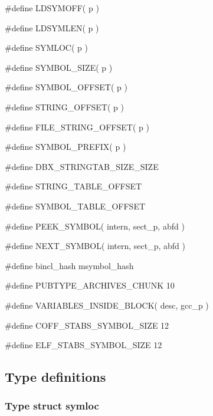 {\stt \#define LDSYMOFF( p )}

\medskip
{\stt \#define LDSYMLEN( p )}

\medskip
{\stt \#define SYMLOC( p )}

\medskip
{\stt \#define SYMBOL\_SIZE( p )}

\medskip
{\stt \#define SYMBOL\_OFFSET( p )}

\medskip
{\stt \#define STRING\_OFFSET( p )}

\medskip
{\stt \#define FILE\_STRING\_OFFSET( p )}

\medskip
{\stt \#define SYMBOL\_PREFIX( p )}

\medskip
{\stt \#define DBX\_STRINGTAB\_SIZE\_SIZE}

\medskip
{\stt \#define STRING\_TABLE\_OFFSET}

\medskip
{\stt \#define SYMBOL\_TABLE\_OFFSET}

\medskip
{\stt \#define PEEK\_SYMBOL( intern, sect\_p, abfd )}

\medskip
{\stt \#define NEXT\_SYMBOL( intern, sect\_p, abfd )}

\medskip
{\stt \#define bincl\_hash msymbol\_hash}

\medskip
{\stt \#define PUBTYPE\_ARCHIVES\_CHUNK 10}

\medskip
{\stt \#define VARIABLES\_INSIDE\_BLOCK( desc, gcc\_p )}

\medskip
{\stt \#define COFF\_STABS\_SYMBOL\_SIZE 12}

\medskip
{\stt \#define ELF\_STABS\_SYMBOL\_SIZE 12}


\subsection{Type definitions}


\subsubsection{Type struct symloc}
\label{type_struct_symloc_dbxread.c}


